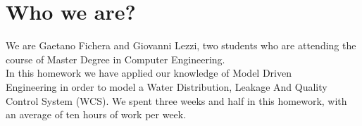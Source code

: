 \chapter{Who we are?}
We are Gaetano Fichera and Giovanni Lezzi, two students who are attending the course of Master Degree in Computer Engineering.\\
In this homework we have applied our knowledge of Model Driven \\
Engineering in order to model a Water Distribution, Leakage And Quality Control System (WCS). We spent three weeks and half in this homework, with an average of ten hours of work per week.
